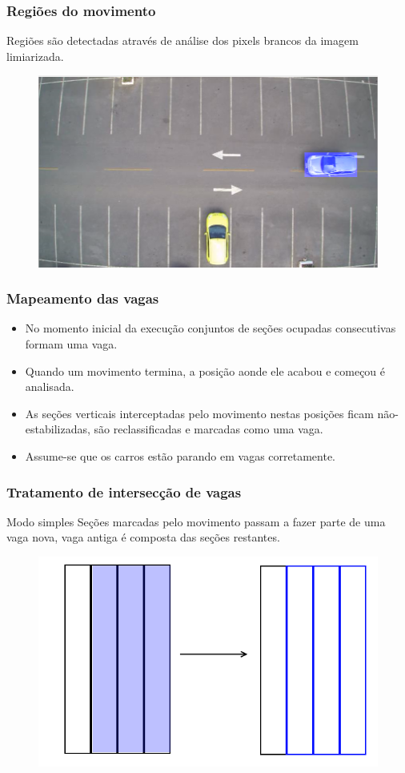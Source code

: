 \documentclass{beamer}
\begin{document}
\begin{frame}
\frametitle{Regiões do movimento}
\begin{block}{}
Regiões são detectadas através de análise dos pixels brancos da imagem limiarizada.
\end{block}

\begin{figure}
\centering
\includegraphics[width=.4\textwidth]{retanguloMovimento}
\centering
\end{figure}
\end{frame}

\begin{frame}
\frametitle{Mapeamento das vagas}
\begin{itemize}
\item No momento inicial da execução conjuntos de seções ocupadas consecutivas formam uma vaga.
\item Quando um movimento termina, a posição aonde ele acabou e começou é analisada.
\item As seções verticais interceptadas pelo movimento nestas posições ficam não-estabilizadas, são reclassificadas e marcadas como uma vaga.
\item Assume-se que os carros estão parando em vagas corretamente.
\end{itemize}
\end{frame}

\begin{frame}
\frametitle{Tratamento de intersecção de vagas}
\begin{block}{Modo simples}
Seções marcadas pelo movimento passam a fazer parte de uma vaga nova, vaga antiga é composta das seções restantes.
\end{block}

\begin{figure}
\centering
\includegraphics[width=.4\textwidth]{umasecao}
\centering
\end{figure}

\end{frame}
\end{document}
